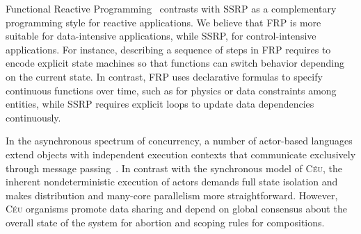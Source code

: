 \documentclass{acm_proc_article-sp}
\newcommand{\CEU}{\textsc{C\'{e}u}\xspace}
\newcommand{\1}{\;}
\newcommand{\2}{\;\;}
\newcommand{\3}{\;\;\;}
\newcommand{\5}{\;\;\;\;\;}
\begin{document}
Functional Reactive Programming~\cite{frp.principles} contrasts with SSRP as a
complementary programming style for reactive applications.
%
We believe that FRP is more suitable for data-intensive applications, while 
SSRP, for control-intensive applications.
%
For instance, describing a sequence of steps in FRP requires to encode explicit 
state machines so that functions can switch behavior depending on the current 
state.
%
In contrast, FRP uses declarative formulas to specify continuous functions over 
time, such as for physics or data constraints among entities, while SSRP 
requires explicit loops to update data dependencies continuously.


In the asynchronous spectrum of concurrency, a number of actor-based languages 
extend objects with independent execution contexts that communicate exclusively 
through message 
passing~\cite{agha.salsa,actors.thorn,actors.jcobox,actors.capsule}.
%
In contrast with the synchronous model of \CEU, the inherent nondeterministic 
execution of actors demands full state isolation and makes distribution and 
many-core parallelism more straightforward.
%
However, \CEU organisms promote data sharing and depend on global consensus 
about the overall state of the system for abortion and scoping rules for 
compositions.

\end{document}
